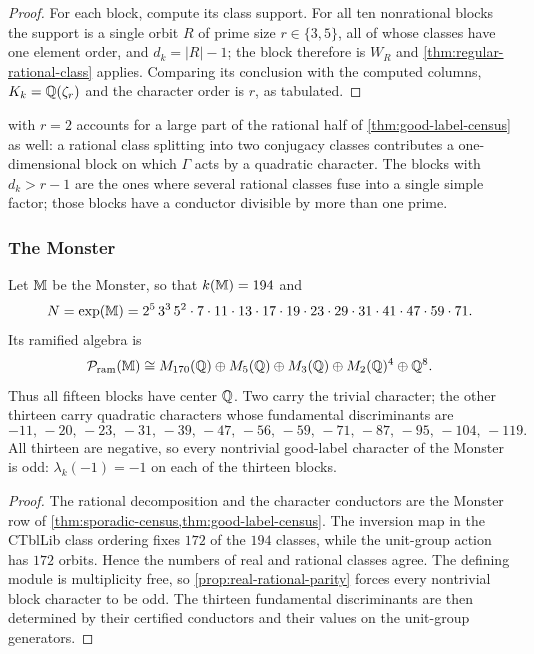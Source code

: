 \begin{proof}
For each block, compute its class support.  For all ten nonrational blocks the
support is a single orbit \(R\) of prime size \(r\in\{3,5\}\), all of whose
classes have one element order, and \(d_k=|R|-1\); the block therefore is
\(W_R\) and \cref{thm:regular-rational-class} applies.  Comparing its
conclusion with the computed columns, \(K_k=\mathbb Q(\zeta_r)\) and the character
order is \(r\), as tabulated.
\end{proof}

 with \(r=2\) accounts for a large part of
the rational half of \cref{thm:good-label-census} as well: a rational class
splitting into two conjugacy classes contributes a one-dimensional block on
which \(\Gamma\) acts by a quadratic character.  The blocks with
\(d_k>r-1\) are the ones where several rational classes fuse into a single
simple factor; those blocks have a
conductor divisible by more than one prime.

\subsubsection{The Monster}

\begin{proposition}
\label{prop:monster-imaginary}
Let \(\mathbb M\) be the Monster, so that \(k(\mathbb M)=194\) and
\begin{equation}
 N=\exp(\mathbb M)=2^5\,3^3\,5^2\cdot7\cdot11\cdot13\cdot17\cdot19\cdot23
 \cdot29\cdot31\cdot41\cdot47\cdot59\cdot71 .
 \label{eq:monster-exponent}
\end{equation}
Its ramified algebra is
\[
 \mathcal P_{\mathrm{ram}}(\mathbb M)\cong
 M_{170}(\mathbb Q)\oplus M_5(\mathbb Q)\oplus M_3(\mathbb Q)
 \oplus M_2(\mathbb Q)^4\oplus\mathbb Q^8.
\]
Thus all fifteen blocks have center \(\mathbb Q\).  Two carry the trivial character;
the other thirteen carry quadratic characters whose
fundamental discriminants are
\begin{equation}
 -11,\,-20,\,-23,\,-31,\,-39,\,-47,\,-56,\,-59,\,-71,\,-87,\,-95,\,-104,\,-119 .
 \label{eq:monster-discriminants}
\end{equation}
All thirteen are negative, so every nontrivial good-label character of the
Monster is odd: \(\lambda_k(-1)=-1\) on each of the thirteen blocks.
\end{proposition}

\begin{proof}
The rational decomposition and the character conductors are the Monster row
of \cref{thm:sporadic-census,thm:good-label-census}.  The inversion map in
the CTblLib class ordering fixes \(172\) of the \(194\) classes, while the
unit-group action has \(172\) orbits.  Hence the numbers of real and rational
classes agree.  The defining module is multiplicity free, so
\cref{prop:real-rational-parity} forces every nontrivial block character to
be odd.  The thirteen fundamental discriminants are then determined by
their certified conductors and their values on the unit-group generators.
\end{proof}

